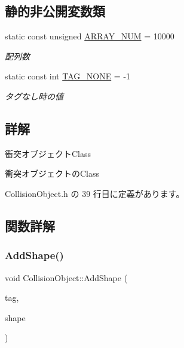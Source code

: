 \subsection*{静的非公開変数類}
\begin{DoxyCompactItemize}
\item 
static const unsigned \mbox{\hyperlink{class_collision_object_a71cbd23c3332b3833d35efd69928804d}{A\+R\+R\+A\+Y\+\_\+\+N\+UM}} = 10000
\begin{DoxyCompactList}\small\item\em 配列数 \end{DoxyCompactList}\item 
static const int \mbox{\hyperlink{class_collision_object_a22badef1e6fc9c2b1f002bd99ede049f}{T\+A\+G\+\_\+\+N\+O\+NE}} = -\/1
\begin{DoxyCompactList}\small\item\em タグなし時の値 \end{DoxyCompactList}\end{DoxyCompactItemize}


\subsection{詳解}
衝突オブジェクト\+Class 

衝突オブジェクトの\+Class 

 Collision\+Object.\+h の 39 行目に定義があります。



\subsection{関数詳解}
\mbox{\label{class_collision_object_a88de22ae14ac514d6b32b466df824482}} 
\subsubsection{\texorpdfstring{Add\+Shape()}{AddShape()}}
{\footnotesize\ttfamily void Collision\+Object\+::\+Add\+Shape (\begin{DoxyParamCaption}\item[{int}]{tag,  }\item[{\mbox{\hyperlink{class_collision_shape_base}{Collision\+Shape\+Base}} $\ast$}]{shape }\end{DoxyParamCaption})}



